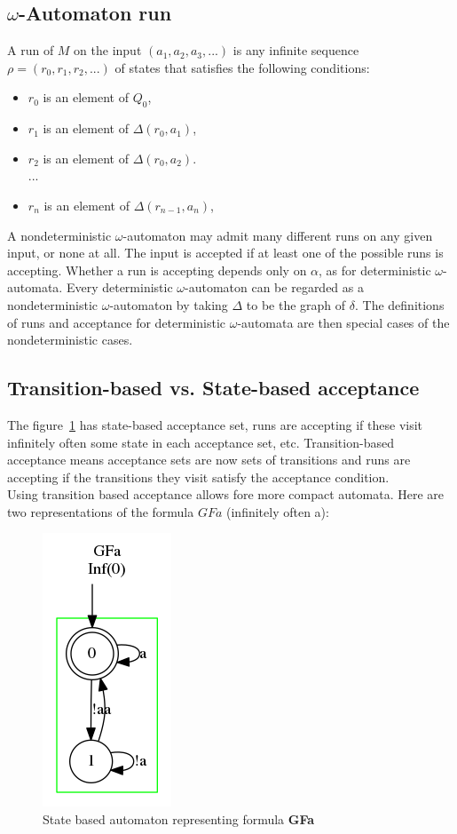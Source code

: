 \subsection{$\omega$-Automaton run}
A run of $M$ on the input $(a_1, a_2, a_3,...)$ is any infinite sequence
$\rho = (r_0, r_1, r_2,...)$ of states that satisfies the following conditions:
\begin{itemize}
 \item $r_0$ is an element of $Q_0$,
 \item $r_1$ is an element of $\Delta(r_0, a_1)$,
 \item $r_2$ is an element of $\Delta(r_0, a_2)$.\\...
 \item $r_n$ is an element of $\Delta(r_{n-1}, a_n)$,
\end{itemize}

A nondeterministic $\omega$-automaton may admit many different runs on any given input, or none at all.
The input is accepted if at least one of the possible runs is accepting. Whether a run is accepting depends
only on $\alpha$, as for deterministic $\omega$-automata. Every deterministic $\omega$-automaton can be
regarded as a nondeterministic $\omega$-automaton by taking $\Delta$ to be the graph of $\delta$.
The definitions of runs and acceptance for deterministic $\omega$-automata are then special cases of the
nondeterministic cases.

\subsection{Transition-based vs. State-based acceptance}
The figure~\ref{fig:state_based} has state-based acceptance set, runs are accepting if these visit infinitely
often some state in each acceptance set, etc. Transition-based acceptance means acceptance sets are now
sets of transitions and runs are accepting if the transitions they visit satisfy the acceptance condition.\\

Using transition based acceptance allows fore more compact automata. Here are two representations of the
formula $GFa$ (infinitely often a):

\begin{figure}[H]
 \centering
 \includegraphics[scale=0.8]{img/state_based.png}
 \caption{State based automaton representing formula \textbf{GFa}}
 \label{fig:state_based}
\end{figure}

